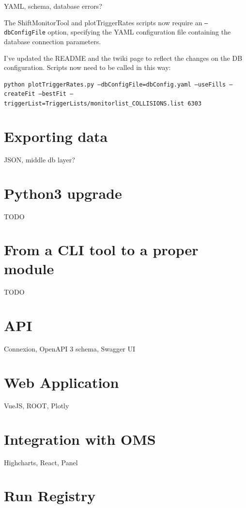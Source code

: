 YAML, schema, database errors?

The ShiftMonitorTool and plotTriggerRates scripts now require an \texttt{--dbConfigFile} option, specifying the YAML configuration file containing the database connection parameters.

I've updated the README and the twiki page to reflect the changes on the DB configuration. Scripts now need to be called in this way:

\texttt{python plotTriggerRates.py --dbConfigFile=dbConfig.yaml --useFills --createFit --bestFit --triggerList=TriggerLists/monitorlist\_COLLISIONS.list 6303}

\section{Exporting data}

JSON, middle db layer?

\section{Python3 upgrade}

TODO

\section{From a CLI tool to a proper module}

TODO

\section{API}

Connexion, OpenAPI 3 schema, Swagger UI

\section{Web Application}

VueJS, ROOT, Plotly

\section{Integration with OMS}

Highcharts, React, Panel

\section{Run Registry}

